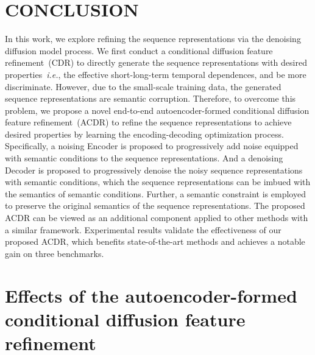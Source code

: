 \documentclass[sigconf]{acmart}
\begin{document}
\section{CONCLUSION}
\label{sec:CONCLUSION}
    In this work, we explore refining the sequence representations via the denoising diffusion model process. 
    We first conduct a conditional diffusion feature refinement~(CDR) to directly generate the sequence representations with desired properties~\textit{i.e.}, the effective short-long-term temporal dependences, and be more discriminate.
   However, due to the small-scale training data, the generated sequence representations are semantic corruption.
   Therefore, to overcome this problem, we propose a novel end-to-end autoencoder-formed conditional diffusion feature refinement~(ACDR) to refine the sequence representations to achieve desired properties by 
   learning the encoding-decoding optimization process.
Specifically, a noising Encoder is proposed to progressively add noise equipped with semantic conditions to the sequence representations.
    And a denoising Decoder is proposed to progressively denoise the 
    noisy sequence representations with semantic conditions, which the sequence representations can
    be imbued with the semantics of semantic conditions. 
    Further, a semantic constraint is employed to preserve the original semantics of the sequence representations.
    The proposed ACDR can be viewed as an additional component applied to other methods with a similar framework.
   Experimental results validate the effectiveness of our
    proposed ACDR, which benefits state-of-the-art methods and achieves a notable gain on three benchmarks. 
\newpage




\newpage
\appendix


\section{Effects of the autoencoder-formed
conditional diffusion feature refinement}
\end{document}

